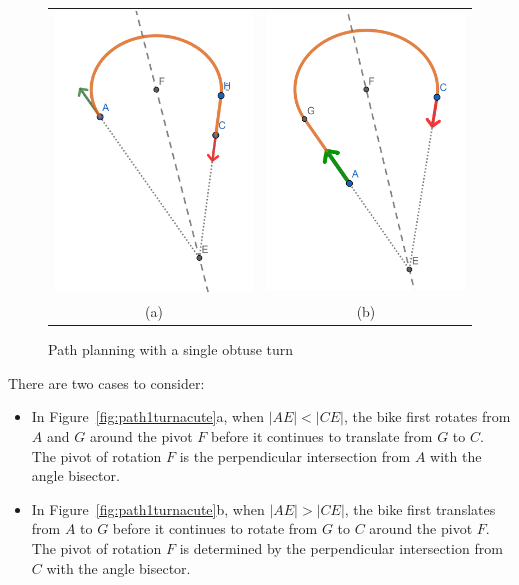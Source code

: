 \documentclass{article}
\begin{document}
\begin{figure}[h]  
  \begin{tabular}{cc}
    \includegraphics[width=6cm]{screenshots/single-obtuse-turn-rot-trans.png} &
    \includegraphics[width=6cm]{screenshots/single-obtuse-turn-trans-rot.png}\\
    (a) & (b)\\
  \end{tabular} 
  \caption{Path planning with a single obtuse turn}
  \label{fig:path1turnobtuse}
\end{figure}


There are two cases to consider:
\begin{itemize}
  \item In Figure~\ref{fig:path1turnacute}a, when $|AE| < |CE|$, the bike first rotates from $A$ and $G$ around the 
  pivot $F$  before it continues to translate from $G$ to $C$. The pivot of rotation $F$ is the perpendicular
  intersection from $A$ with the angle bisector.
  \item In Figure~\ref{fig:path1turnacute}b, when $|AE| > |CE|$, the bike first translates from $A$ to $G$ before it 
  continues to rotate from $G$ to $C$ around the pivot $F$. The pivot of rotation $F$ is determined
  by the perpendicular intersection from $C$ with the angle bisector.
\end{itemize}
\end{document}
